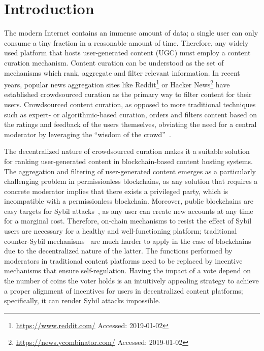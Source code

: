 \section{Introduction}
  The modern Internet contains an immense amount of data; a single user can only
  consume a tiny fraction in a reasonable amount of time. Therefore, any widely
  used platform that hosts user-generated content (UGC) must employ a content
  curation mechanism. Content curation can be understood as the set of
  mechanisms which rank, aggregate and filter relevant information. In recent
  years, popular news aggregation sites like
  Reddit\footnote{\url{https://www.reddit.com/} Accessed: 2019-01-02} or Hacker
  News\footnote{\url{https://news.ycombinator.com/} Accessed: 2019-01-02} have
  established crowdsourced curation as the primary way to filter content for
  their users. Crowdsourced content curation, as opposed to more traditional
  techniques such as expert- or algorithmic-based curation, orders and filters
  content based on the ratings and feedback of the users themselves, obviating
  the need for a central moderator by leveraging the ``wisdom of the
  crowd''~\cite{askalidis2013theoretical}.

  The decentralized nature of crowdsourced curation makes it a suitable solution
  for ranking user-generated content in blockchain-based content hosting
  systems. The aggregation and filtering of user-generated content emerges as a
  particularly challenging problem in permissionless blockchains, as any
  solution that requires a concrete moderator implies that there exists a
  privileged party, which is incompatible with a permissionless blockchain.
  Moreover, public blockchains are easy targets for Sybil
  attacks~\cite{sybilattack}, as any user can create new accounts at any time
  for a marginal cost. Therefore, on-chain mechanisms to resist the effect of
  Sybil users are necessary for a healthy and well-functioning platform;
  traditional counter-Sybil mechanisms~\cite{levine2006survey} are much harder
  to apply in the case of blockchains due to the decentralized nature of the
  latter. The functions performed by moderators in traditional content platforms
  need to be replaced by incentive mechanisms that ensure self-regulation.
  Having the impact of a vote depend on the number of coins the voter holds is
  an intuitively appealing strategy to achieve a proper alignment of incentives
  for users in decentralized content platforms; specifically, it can render
  Sybil attacks impossible.

